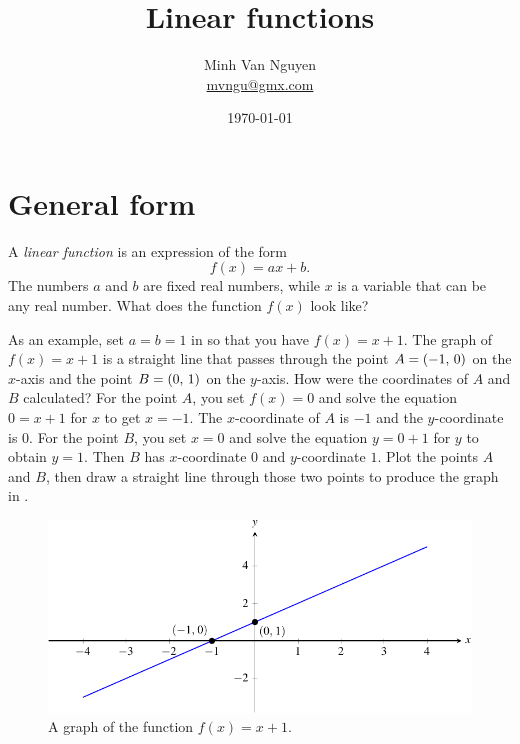 \documentclass[a4paper,oneside,12pt]{article}
\begin{document}
\title{\Large\bf Linear functions}
\author{%
  Minh Van Nguyen \\
  \url{mvngu@gmx.com}
}
\date{\today}
\maketitle



\section{General form}
\label{sec:general_form}

A \emph{linear function} is an expression of the form
\begin{equation}
\label{eqn:linear_function_general}
f(x)
=
ax + b.
\end{equation}
The numbers $a$ and $b$ are fixed real numbers, while $x$ is a
variable that can be any real number.  What does the function $f(x)$
look like?

As an example, set $a = b = 1$ in
 so that you have
$f(x) = x + 1$.  The graph of $f(x) = x + 1$ is a straight line that
passes through the point $A = \left\lparen{-1},\, {0}\right\rparen$ on the $x$-axis and the
point $B = \left\lparen{0},\, {1}\right\rparen$ on the $y$-axis.  How were the coordinates of
$A$ and $B$ calculated?  For the point $A$, you set $f(x) = 0$ and
solve the equation $0 = x + 1$ for $x$ to get $x = -1$.  The
$x$-coordinate of $A$ is $-1$ and the $y$-coordinate is $0$.  For the
point $B$, you set $x = 0$ and solve the equation $y = 0 + 1$ for $y$
to obtain $y = 1$.  Then $B$ has $x$-coordinate $0$ and $y$-coordinate
$1$.  Plot the points $A$ and $B$, then draw a straight line through
those two points to produce the graph in .

\begin{figure}[!htbp]
\centering
\includegraphics[scale=1]{image/06/a-1-b-1.pdf}
\caption{%
  A graph of the function $f(x) = x + 1$.
}
\label{fig:plot_x_+_1}
\end{figure}
\end{document}
